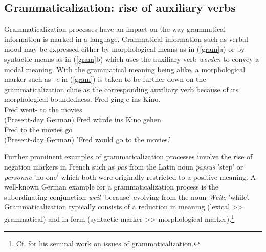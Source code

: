 \documentclass[output=paper]{langsci/langscibook}
\begin{document}
\subsection{Grammaticalization: rise of auxiliary verbs \label{GR}} 

Grammaticalization processes have an impact on the way grammatical information is marked in a language. Grammatical information such as verbal mood may be expressed either by morphological means as in (\ref{gram}a) or by syntactic means as in (\ref{gram}b) which uses the auxiliary verb \textit{werden} to convey a modal meaning. With the grammatical meaning being alike, a morphological marker such as \textit{-e} in (\ref{gram}) is taken to be further down on the grammaticalization cline as the corresponding auxiliary verb because of its morphological boundedness.  
\eal \label{gram}
\ex 
\gll Fred ging-e ins Kino. \\  Fred went-\SBJV{} {to the} movies \\  \hfill (Present-day German)
\ex
\gll  Fred würde ins Kino gehen. \\ Fred \SBJV{} {to the} movies go \\  \hfill (Present-day German)
\glt 'Fred would go to the movies.'
\zl

Further prominent examples of grammaticalization processes involve the rise of negation markers in French such as  \textit{pas} from the Latin noun \textit{passus} 'step' or \textit{personne} 'no-one' which both were originally restricted to a positive meaning. A well-known German example for a grammaticalization process is the subordinating conjunction \textit{weil} 'because' evolving from the noun \textit{Weile} 'while'. Grammaticalization typically consists of a reduction in meaning (lexical >> grammatical) and in form (syntactic marker >> morphological marker).\footnote{Cf. \cite{lehmann2015} for his seminal work on issues of grammaticalization.}
\end{document}
